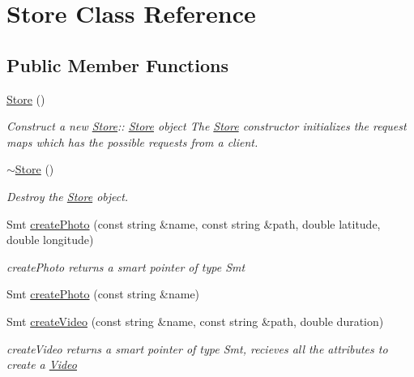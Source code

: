 \hypertarget{class_store}{}\section{Store Class Reference}
\label{class_store}
\subsection*{Public Member Functions}
\begin{DoxyCompactItemize}
\item 
\mbox{\label{class_store_a5f58eadcb7385d5a5aa6830daef84f7d}} 
\mbox{\hyperlink{class_store_a5f58eadcb7385d5a5aa6830daef84f7d}{Store}} ()
\begin{DoxyCompactList}\small\item\em Construct a new \mbox{\hyperlink{class_store}{Store}}\+:\+: \mbox{\hyperlink{class_store}{Store}} object The \mbox{\hyperlink{class_store}{Store}} constructor initializes the request maps which has the possible requests from a client. \end{DoxyCompactList}\item 
\mbox{\hyperlink{class_store_a4fd725fdb2de0632ed98bfbd131c2512}{$\sim$\+Store}} ()
\begin{DoxyCompactList}\small\item\em Destroy the \mbox{\hyperlink{class_store}{Store}} object. \end{DoxyCompactList}\item 
Smt \mbox{\hyperlink{class_store_a9d97fd0e6e2a8cf0fd90b1b75c9cdaaf}{create\+Photo}} (const string \&name, const string \&path, double latitude, double longitude)
\begin{DoxyCompactList}\small\item\em create\+Photo returns a smart pointer of type Smt \end{DoxyCompactList}\item 
Smt \mbox{\hyperlink{class_store_abbe18026f085a4a61af546b14be7ebaa}{create\+Photo}} (const string \&name)
\item 
Smt \mbox{\hyperlink{class_store_a510695513f26f4c5d5760a7683776d45}{create\+Video}} (const string \&name, const string \&path, double duration)
\begin{DoxyCompactList}\small\item\em create\+Video returns a smart pointer of type Smt, recieves all the attributes to create a \mbox{\hyperlink{class_video}{Video}} \end{DoxyCompactList}\item 

\end{DoxyCompactItemize}
